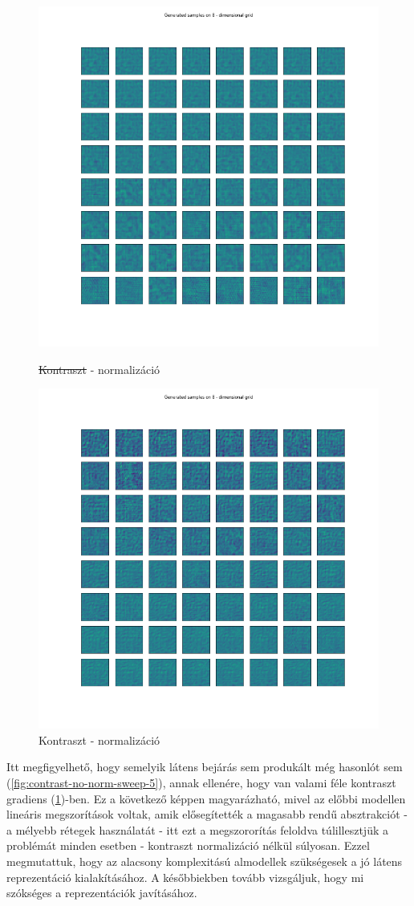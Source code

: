 \documentclass[12pt, english]{article}
\begin{document}
\begin{figure}[H]
  \begin{minipage}{0.5\linewidth}
    \centering
    \includegraphics[width=.62\linewidth]{lvae2/contrast_norm_no_contrast_sweep.png} 
    \caption{\st{Kontraszt} - normalizáció} 
    \label{fig:no-contrast-norm-sweep}
  \end{minipage}%
  \begin{minipage}{0.5\linewidth}
    \centering
    \includegraphics[width=.62\linewidth]{lvae2/contrast_norm_contrast_sweep.png} 
    \caption{Kontraszt - normalizáció} 
    \label{fig:contrast-norm-sweep}
  \end{minipage} 
\end{figure}

\vspace{4mm}

\par Itt megfigyelhető, hogy semelyik látens bejárás sem produkált még hasonlót sem (\ref{fig:contrast-no-norm-sweep-5}), annak ellenére, hogy van valami féle kontraszt gradiens (\ref{fig:contrast-norm-sweep})-ben. Ez a következő képpen magyarázható, mivel az előbbi modellen lineáris megszorítások voltak, amik elősegítették a magasabb rendű absztrakciót - a mélyebb rétegek használatát - itt ezt a megszororítás feloldva túlillesztjük a problémát minden esetben - kontraszt normalizáció nélkül súlyosan. Ezzel megmutattuk, hogy az alacsony komplexitású almodellek szükségesek a jó látens reprezentáció kialakításához. A későbbiekben tovább vizsgáljuk, hogy mi szókséges a reprezentációk javításához.
\end{document}
